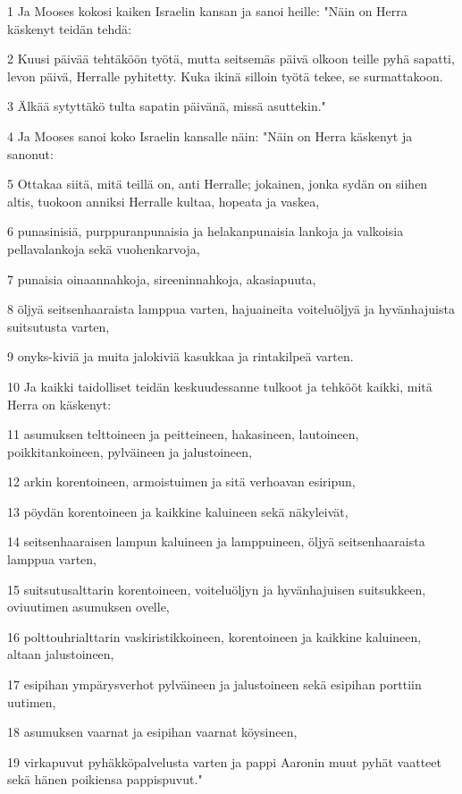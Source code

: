 \par 1 Ja Mooses kokosi kaiken Israelin kansan ja sanoi heille: "Näin on Herra käskenyt teidän tehdä:
\par 2 Kuusi päivää tehtäköön työtä, mutta seitsemäs päivä olkoon teille pyhä sapatti, levon päivä, Herralle pyhitetty. Kuka ikinä silloin työtä tekee, se surmattakoon.
\par 3 Älkää sytyttäkö tulta sapatin päivänä, missä asuttekin."
\par 4 Ja Mooses sanoi koko Israelin kansalle näin: "Näin on Herra käskenyt ja sanonut:
\par 5 Ottakaa siitä, mitä teillä on, anti Herralle; jokainen, jonka sydän on siihen altis, tuokoon anniksi Herralle kultaa, hopeata ja vaskea,
\par 6 punasinisiä, purppuranpunaisia ja helakanpunaisia lankoja ja valkoisia pellavalankoja sekä vuohenkarvoja,
\par 7 punaisia oinaannahkoja, sireeninnahkoja, akasiapuuta,
\par 8 öljyä seitsenhaaraista lamppua varten, hajuaineita voiteluöljyä ja hyvänhajuista suitsutusta varten,
\par 9 onyks-kiviä ja muita jalokiviä kasukkaa ja rintakilpeä varten.
\par 10 Ja kaikki taidolliset teidän keskuudessanne tulkoot ja tehkööt kaikki, mitä Herra on käskenyt:
\par 11 asumuksen telttoineen ja peitteineen, hakasineen, lautoineen, poikkitankoineen, pylväineen ja jalustoineen,
\par 12 arkin korentoineen, armoistuimen ja sitä verhoavan esiripun,
\par 13 pöydän korentoineen ja kaikkine kaluineen sekä näkyleivät,
\par 14 seitsenhaaraisen lampun kaluineen ja lamppuineen, öljyä seitsenhaaraista lamppua varten,
\par 15 suitsutusalttarin korentoineen, voiteluöljyn ja hyvänhajuisen suitsukkeen, oviuutimen asumuksen ovelle,
\par 16 polttouhrialttarin vaskiristikkoineen, korentoineen ja kaikkine kaluineen, altaan jalustoineen,
\par 17 esipihan ympärysverhot pylväineen ja jalustoineen sekä esipihan porttiin uutimen,
\par 18 asumuksen vaarnat ja esipihan vaarnat köysineen,
\par 19 virkapuvut pyhäkköpalvelusta varten ja pappi Aaronin muut pyhät vaatteet sekä hänen poikiensa pappispuvut."
